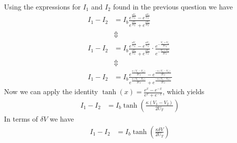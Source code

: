 \subsubsection{}
Using the expressions for \(I_1\) and \(I_2\) found in the previous question we have
\begin{align*}
    I_1-I_2 &=I_b \frac{e^{\frac{\kappa V_1}{U_T}} - e^{\frac{\kappa V_2}{U_T}}}{e^{\frac{\kappa V_1}{U_T}}+e^{\frac{\kappa V_2}{U_T}}} \\ 
            &\Updownarrow \\
    I_1-I_2 &=I_b \frac{e^{\frac{\kappa V_1}{U_T}} - e^{\frac{\kappa V_2}{U_T}}}{e^{\frac{\kappa V_1}{U_T}}+e^{\frac{\kappa V_2}{U_T}}}\cdot\frac{e^{-\frac{V_1+V_2}{2U_T}}}{e^{-\frac{V_1+V_2}{2U_T}}} \\ 
            &\Updownarrow \\
    I_1-I_2 &=I_b \frac{e^{\frac{\kappa (V_1-V_2)}{2U_T}} - e^{\frac{-\kappa (V_1-V_2)}{2U_T}}}{e^{\frac{\kappa (V_1-V_2)}{2U_T}}+e^{\frac{-\kappa (V_1-V_2)}{2U_T}}} 
\end{align*}
Now we can apply the identity \(\tanh\left(x\right)=\frac{e^x-e^{-x}}{e^x+e^{-x}}\), which yields
\begin{align*}
    I_1-I_2 &= I_b \tanh\left(\frac{\kappa(V_1-V_2)}{2U_T}\right)
\end{align*}
In terms of \(\delta V\) we have
\begin{align*}
    I_1-I_2 &= I_b \tanh\left(\frac{\kappa\delta V}{2U_T}\right)
\end{align*}
